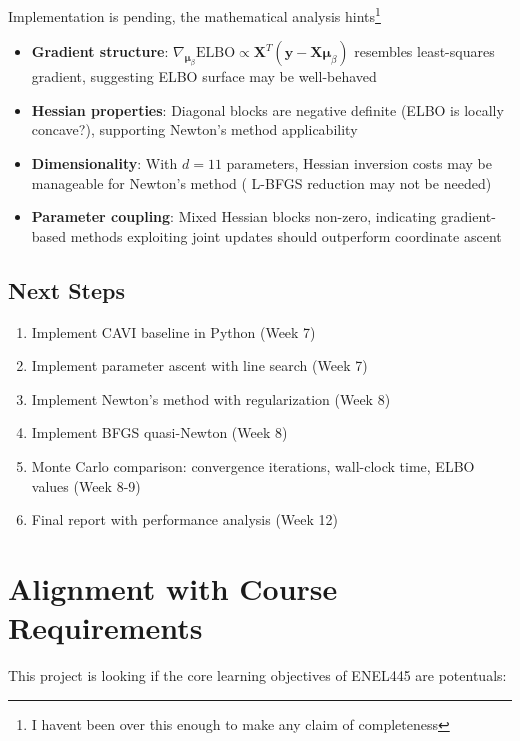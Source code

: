 \documentclass[11pt]{article}
\newcommand{\ELBO}{\text{ELBO}}
\begin{document}
Implementation is pending, the mathematical analysis hints\footnote{I havent been over this enough to make any claim of completeness}

\begin{itemize}
\item \textbf{Gradient structure}: $\nabla_{\bm{\mu}_\beta} \ELBO \propto \bm{X}^T(\bm{y} - \bm{X}\bm{\mu}_\beta)$ resembles least-squares gradient, suggesting ELBO surface may be well-behaved

\item \textbf{Hessian properties}: Diagonal blocks are negative definite (ELBO is locally concave?), supporting Newton's method applicability

\item \textbf{Dimensionality}: With $d=11$ parameters, Hessian inversion costs may be manageable for Newton's method ( L-BFGS reduction may not be needed)

\item \textbf{Parameter coupling}: Mixed Hessian blocks non-zero, indicating gradient-based methods exploiting joint updates should outperform coordinate ascent
\end{itemize}
\newpage
\subsection*{Next Steps}

\begin{enumerate}
\item Implement CAVI baseline in Python (Week 7)
\item Implement parameter ascent with line search (Week 7)
\item Implement Newton's method with regularization (Week 8)
\item Implement BFGS quasi-Newton (Week 8)
\item Monte Carlo comparison: convergence iterations, wall-clock time, ELBO values (Week 8-9)
\item Final report with performance analysis (Week 12)
\end{enumerate}

\section*{Alignment with Course Requirements}

This project is looking if  the core learning objectives of ENEL445 are potentuals:
\end{document}

